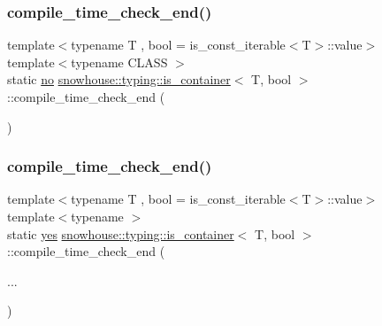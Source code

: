 \subsubsection{\texorpdfstring{compile\_time\_check\_end()}{compile\_time\_check\_end()}\hspace{0.1cm}{\footnotesize\ttfamily [1/2]}}
{\footnotesize\ttfamily template$<$typename T , bool  = is\+\_\+const\+\_\+iterable$<$\+T$>$\+::value$>$ \\
template$<$typename C\+L\+A\+SS $>$ \\
static \mbox{\hyperlink{namespacesnowhouse_1_1typing_ad9bd8c4cca2c9f7de1faf7a7f53b1bda}{no}} \mbox{\hyperlink{structsnowhouse_1_1typing_1_1is__container}{snowhouse\+::typing\+::is\+\_\+container}}$<$ T, bool $>$\+::compile\+\_\+time\+\_\+check\+\_\+end (\begin{DoxyParamCaption}\item[{\mbox{\hyperlink{structsnowhouse_1_1typing_1_1is__container_1_1is__of__type}{is\+\_\+of\+\_\+type}}$<$ \mbox{\hyperlink{structsnowhouse_1_1typing_1_1is__container_a483fd82ca18826d91df5ecf9b0635f19}{fallback\+\_\+method}}, \&C\+L\+A\+S\+S\+::end $>$ $\ast$}]{ }\end{DoxyParamCaption})\hspace{0.3cm}{\ttfamily [static]}}

\mbox{\label{structsnowhouse_1_1typing_1_1is__container_a3cdf728c23a2fae68fed6dae11363f14}} 
\subsubsection{\texorpdfstring{compile\_time\_check\_end()}{compile\_time\_check\_end()}\hspace{0.1cm}{\footnotesize\ttfamily [2/2]}}
{\footnotesize\ttfamily template$<$typename T , bool  = is\+\_\+const\+\_\+iterable$<$\+T$>$\+::value$>$ \\
template$<$typename $>$ \\
static \mbox{\hyperlink{namespacesnowhouse_1_1typing_a4b319cb7567ee3475023c05ed2dadb16}{yes}} \mbox{\hyperlink{structsnowhouse_1_1typing_1_1is__container}{snowhouse\+::typing\+::is\+\_\+container}}$<$ T, bool $>$\+::compile\+\_\+time\+\_\+check\+\_\+end (\begin{DoxyParamCaption}\item[{}]{... }\end{DoxyParamCaption})\hspace{0.3cm}{\ttfamily [static]}}



